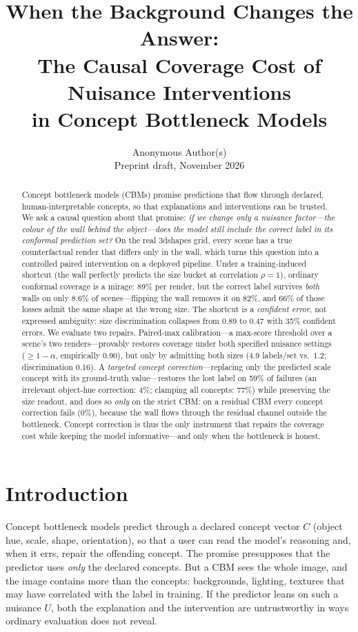 \documentclass[11pt]{article}
\title{When the Background Changes the Answer:\\
The Causal Coverage Cost of Nuisance Interventions\\
in Concept Bottleneck Models}
\author{Anonymous Author(s) \\ \small Preprint draft, November 2026}
\date{}
\begin{document}
\maketitle

\begin{abstract}
Concept bottleneck models (CBMs) promise predictions that flow through declared,
human-interpretable concepts, so that explanations and interventions can be
trusted. We ask a causal question about that promise: \emph{if we change only a
nuisance factor---the colour of the wall behind the object---does the model
still include the correct label in its conformal prediction set?} On the real
3dshapes grid, every scene has a true counterfactual render that differs only in
the wall, which turns this question into a controlled paired intervention on a
deployed pipeline. Under a training-induced shortcut (the wall perfectly
predicts the size bucket at correlation $\rho=1$), ordinary conformal coverage
is a mirage: 89\% per render, but the correct label survives \emph{both} walls
on only 8.6\% of scenes---flipping the wall removes it on 82\%, and 66\% of
those losses admit the same shape at the wrong size. The shortcut is a
\emph{confident error}, not expressed ambiguity: size discrimination collapses
from 0.89 to 0.47 with 35\% confident errors. We evaluate two repairs. Paired-max
calibration---a max-score threshold over a scene's two renders---provably
restores coverage under both specified nuisance settings ($\ge 1-\alpha$,
empirically 0.90), but only by admitting both sizes (4.9 labels/set vs.\ 1.2;
discrimination 0.16). A \emph{targeted concept correction}---replacing only the
predicted scale concept with its ground-truth value---restores the lost label
on 59\% of failures (an irrelevant object-hue correction: 4\%; clamping all
concepts: 77\%) while preserving the size readout, and does so \emph{only} on
the strict CBM: on a residual CBM every concept correction fails (0\%), because
the wall flows through the residual channel outside the bottleneck. Concept
correction is thus the only instrument that repairs the coverage cost while
keeping the model informative---and only when the bottleneck is honest.
\end{abstract}

\section{Introduction}
\label{sec:intro}

Concept bottleneck models \citep{koh2020concept} predict through a declared
concept vector $C$ (object hue, scale, shape, orientation), so that a user can
read the model's reasoning and, when it errs, repair the offending concept. The
promise presupposes that the predictor uses \emph{only} the declared concepts.
But a CBM sees the whole image, and the image contains more than the concepts:
backgrounds, lighting, textures that may have correlated with the label in
training. If the predictor leans on such a nuisance $U$, both the explanation
and the intervention are untrustworthy in ways ordinary evaluation does not
reveal.
\end{document}
